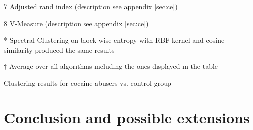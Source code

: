 \documentclass[12pt,a4paper,bibliography=totocnumbered,listof=totocnumbered]{scrartcl}
\begin{document}
{\begin{threeparttable}[H]
\begin{tcolorbox}[arc=0mm,title=Notes,boxrule=0.2mm,colbacktitle=white,coltitle=black,colback=white,top=0mm,bottom=0.1mm]
\begin{tablenotes}
	        \item[7] Adjusted rand index (description see appendix \ref{sec:ce})
	        \item[8] V-Measure (description see appendix \ref{sec:ce})
	        \item[*] Spectral Clustering on block wise entropy with RBF kernel and cosine similarity produced the same results
	        \item[$\dagger$] Average over all algorithms including the ones displayed in the table
	\end{tablenotes}
	\end{tcolorbox}
	\caption{Clustering results for cocaine abusers vs. control group} 
	\label{tab:cocainresults}
 \end{threeparttable} 


\section{Conclusion and possible extensions}

}
\end{document}

